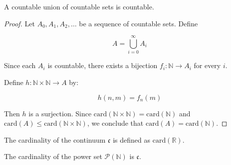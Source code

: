 \begin{thm}
    A countable union of countable sets is countable.
\end{thm}

\begin{proof}
    Let $A_0,A_1,A_2,\ldots$ be a sequence of countable sets. Define

    \[
        A = \bigcup_{i=0}^{\infty} A_i
    \]

    Since each $A_i$ is countable, there exists a bijection $f_i: \mathbb{N} \to A_i$ for every $i$.

    Define $h: \mathbb{N} \times \mathbb{N} \to A$ by:

    \[
        h(n,m) = f_n (m)
    \]

    Then $h$ is a surjection. Since $\mathrm{card}(\mathbb{N} \times \mathbb{N}) = \mathrm{card}(\mathbb{N})$ and
    $\mathrm{card}(A) \le \mathrm{card}(\mathbb{N} \times \mathbb{N})$, we conclude that
    $\mathrm{card}(A) = \mathrm{card}(\mathbb{N})$.
\end{proof}

\begin{definition}
    The cardinality of the continuum $\mathfrak{c}$ is defined as $\mathrm{card}(\mathbb{R})$.
\end{definition}

\begin{thm}
    The cardinality of the power set $\mathcal{P}(\mathbb{N})$ is $\mathfrak{c}$.
\end{thm}


